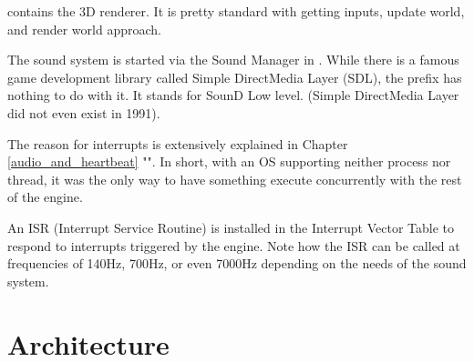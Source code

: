 \documentclass[book.tex]{subfiles}
\begin{document}
\begin{minipage}{\textwidth}

\end{minipage}
\par
{} contains the 3D renderer. It is pretty standard with getting inputs, update world, and render world approach.\\
\par
\begin{minipage}{\textwidth}

\end{minipage}
\par
The sound system is started via the Sound Manager in . While there is a famous game development library called Simple DirectMedia Layer (SDL), the prefix  has nothing to do with it. It stands for SounD Low level. (Simple DirectMedia Layer did not even exist in 1991).\\
\par
The reason for interrupts is extensively explained in Chapter \ref{audio_and_heartbeat} "". In short, with an OS supporting neither process nor thread, it was the only way to have something execute concurrently with the rest of the engine.\\
\par
An ISR (Interrupt Service Routine) is installed in the Interrupt Vector Table to respond to interrupts triggered by the engine. Note how the ISR can be called at frequencies of 140Hz, 700Hz, or even 7000Hz depending on the needs of the sound system.\\
\par
\vspace{20pt}
\begin{minipage}{\textwidth}

\end{minipage}
\par















\pagebreak
\section{Architecture}
\end{document}
